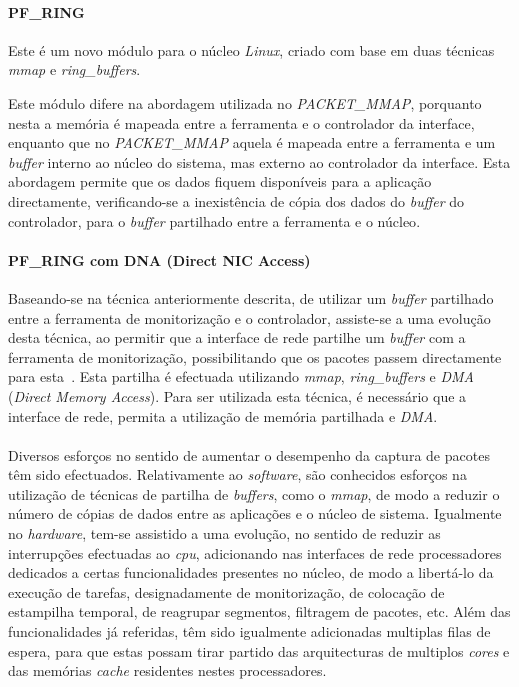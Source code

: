 \paragraph*{PF\_RING}

Este é um novo módulo para o núcleo \textit{Linux}, criado com base em duas técnicas \textit{mmap} e \textit{ring\_buffers}.

Este módulo difere na abordagem utilizada no \textit{PACKET\_MMAP}, porquanto nesta a memória é mapeada entre a ferramenta e o controlador da interface, enquanto que no \textit{PACKET\_MMAP} aquela é mapeada entre a ferramenta e um \textit{buffer} interno ao núcleo do sistema, mas externo ao controlador da interface.
Esta abordagem permite que os dados fiquem disponíveis para a aplicação directamente, verificando-se a inexistência de cópia dos dados do \textit{buffer} do controlador, para o \textit{buffer} partilhado entre a ferramenta e o núcleo\cite{PFRING}.
 
\paragraph*{PF\_RING com DNA (Direct NIC Access)}
Baseando-se na técnica anteriormente descrita, de utilizar um \textit{buffer} partilhado entre a ferramenta de monitorização e o controlador, assiste-se a uma evolução desta técnica, ao permitir que a interface de rede partilhe um \textit{buffer} com a ferramenta de monitorização, possibilitando que os pacotes passem directamente para esta~\cite{IntroPF_RIDNADirecNICAcces}.
Esta partilha é efectuada utilizando \textit{mmap}, \textit{ring\_buffers} e \textit{DMA} (\textit{Direct Memory Access}).
Para ser utilizada esta técnica, é necessário que a interface de rede, permita a utilização de memória partilhada e \textit{DMA}.

\paragraph*{}

Diversos esforços no sentido de aumentar o desempenho da captura de pacotes têm sido efectuados.
Relativamente ao \textit{software}, são conhecidos esforços na utilização de técnicas de partilha de \textit{buffers}, como o \textit{mmap}, de modo a reduzir o número de cópias de dados entre as aplicações e o núcleo de sistema.
Igualmente no \textit{hardware}, tem-se assistido a uma evolução, no sentido de reduzir as interrupções efectuadas ao \textit{cpu}, adicionando nas interfaces de rede processadores dedicados a certas funcionalidades presentes no núcleo, de modo a libertá-lo da execução de tarefas, designadamente de monitorização, de colocação de estampilha temporal, de reagrupar segmentos, filtragem de pacotes, etc.
Além das funcionalidades já referidas, têm sido igualmente adicionadas multiplas filas de espera, para que estas possam tirar partido das arquitecturas de multiplos \textit{cores} e das memórias \textit{cache} residentes nestes processadores.

